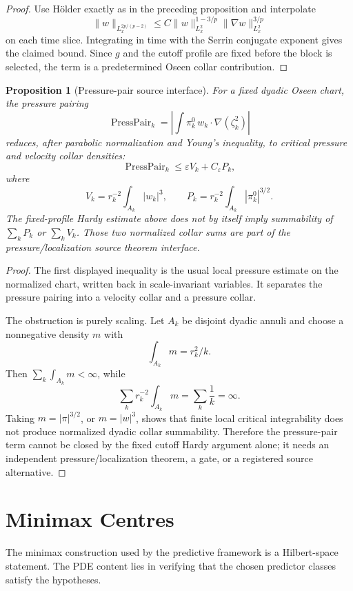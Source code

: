 \documentclass[11pt]{article}
\newtheorem{proposition}[theorem]{Proposition}
\begin{document}
\begin{proof}
Use Hölder exactly as in the preceding proposition and interpolate
\[
\|w\|_{L^{2p/(p-2)}_x}
\le
C
\|w\|_{L^2_x}^{1-3/p}
\|\nabla w\|_{L^2_x}^{3/p}
\]
on each time slice.  Integrating in time with the Serrin conjugate exponent gives
the claimed bound.  Since \(g\) and the cutoff profile are fixed before the block
is selected, the term is a predetermined Oseen collar contribution.
\end{proof}

\begin{proposition}[Pressure-pair source interface]
For a fixed dyadic Oseen chart, the pressure pairing
\[
\operatorname{PressPair}_k
=
\left|\int \pi_k^0\,w_k\cdot\nabla(\zeta_k^2)\right|
\]
reduces, after parabolic normalization and Young's inequality, to critical
pressure and velocity collar densities:
\[
\operatorname{PressPair}_k
\le
\varepsilon V_k+C_\varepsilon P_k,
\]
where
\[
V_k=r_k^{-2}\int_{A_k}|w_k|^3,
\qquad
P_k=r_k^{-2}\int_{A_k}|\pi_k^0|^{3/2}.
\]
The fixed-profile Hardy estimate above does not by itself imply summability of
\(\sum_k P_k\) or \(\sum_k V_k\).  Those two normalized collar sums are part of
the pressure/localization source theorem interface.
\end{proposition}

\begin{proof}
The first displayed inequality is the usual local pressure estimate on the
normalized chart, written back in scale-invariant variables.  It separates the
pressure pairing into a velocity collar and a pressure collar.

The obstruction is purely scaling.  Let \(A_k\) be disjoint dyadic annuli and
choose a nonnegative density \(m\) with
\[
\int_{A_k}m=r_k^2/k.
\]
Then \(\sum_k\int_{A_k}m<\infty\), while
\[
\sum_k r_k^{-2}\int_{A_k}m
=
\sum_k\frac1k
=\infty .
\]
Taking \(m=|\pi|^{3/2}\), or \(m=|w|^3\), shows that finite local critical
integrability does not produce normalized dyadic collar summability.  Therefore
the pressure-pair term cannot be closed by the fixed cutoff Hardy argument
alone; it needs an independent pressure/localization theorem, a gate, or a
registered source alternative.
\end{proof}

\section{Minimax Centres}

The minimax construction used by the predictive framework is a Hilbert-space statement. The PDE content lies in verifying that the chosen predictor classes satisfy the hypotheses.
\end{document}
